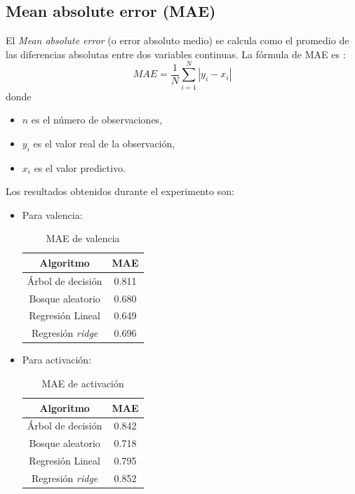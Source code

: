 \documentclass[12pt,a4paper,Spanish]{article}
\begin{document}
\subsection{Mean absolute error (MAE)}
El \textit{Mean absolute error} (o error absoluto medio) se calcula como el promedio de las diferencias absolutas entre dos variables continuas. La fórmula de MAE es \cite{eswiki:146234007}:
\begin{equation}
	MAE = \frac{1}{N} \sum_{i=1}^{N} |y_i - x_i|
\end{equation}
donde
\begin{itemize}
	\item $n$ es el número de observaciones,
	\item $y_i$ es el valor real de la observación,
	\item $x_i$ es el valor predictivo.
\end{itemize}
Los resultados obtenidos durante el experimento son:
\begin{itemize}
	\item Para valencia:
	\begin{table}[H]
		\centering
		\caption{MAE de valencia}
		\begin{tabular}{|c|c|}
			\hline
			\textbf{Algoritmo} & \textbf{MAE} \\
			\hline
			Árbol de decisión & 0.811 \\
			Bosque aleatorio & 0.680 \\
			Regresión Lineal & 0.649 \\
			Regresión \textit{ridge} & 0.696 \\
			\hline
		\end{tabular}
	\end{table}
	\item Para activación:
	\begin{table}[H]
		\centering
		\caption{MAE de activación}
		\begin{tabular}{|c|c|}
			\hline
			\textbf{Algoritmo} & \textbf{MAE} \\
			\hline
			Árbol de decisión & 0.842 \\
			Bosque aleatorio & 0.718 \\
			Regresión Lineal & 0.795 \\
			Regresión \textit{ridge} & 0.852 \\
			\hline
		\end{tabular}
	\end{table}
\end{itemize}
\end{document}

